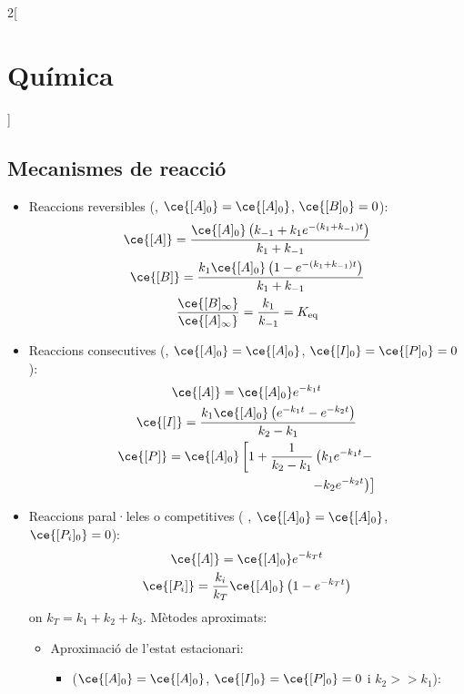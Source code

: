 \documentclass[../../../main.tex]{subfiles}
\begin{document}
\begin{multicols}{2}[\section{Química}]
\subsection{Mecanismes de reacció}
\begin{itemize}
    \item Reaccions reversibles (, $\ce{[A]_0}=\ce{[A]_0}$, $\ce{[B]_0}=0$):
    \begin{gather*}
        \ce{[A]}=\frac{\ce{[A]_0}\left(k_{-1}+k_1e^{-(k_1+k_{-1})t}\right)}{k_1+k_{-1}}\\
        \ce{[B]}=\frac{k_1\ce{[A]_0}\left(1-e^{-(k_1+k_{-1})t}\right)}{k_1+k_{-1}}\\
        \frac{\ce{[B]_\infty}}{\ce{[A]_\infty}}=\frac{k_1}{k_{-1}}=K_\text{eq}
    \end{gather*}
    \item Reaccions consecutives (, $\ce{[A]_0}=\ce{[A]_0}$, $\ce{[I]_0}=\ce{[P]_0}=0$):
    \begin{gather*}
        \ce{[A]}=\ce{[A]_0}e^{-k_1t}\\
        \ce{[I]}=\frac{k_1\ce{[A]_0}\left(e^{-k_1t}-e^{-k_2t}\right)}{k_2-k_1}\\
        \begin{split}
        \ce{[P]}=\ce{[A]_0}\left[1+\frac{1}{k_2-k_1}\left(k_1e^{-k_1t}-\right.\right.\\\left.\left.-k_2e^{-k_2t}\right)\right]
        \end{split}
    \end{gather*}
    \item Reaccions paral·leles o competitives (  , $\ce{[A]_0}=\ce{[A]_0}$, $\ce{[P_i]_0}=0$):
    \begin{gather*}
        \ce{[A]}=\ce{[A]_0}e^{-k_Tt}\\
        \ce{[P_i]}=\frac{k_i}{k_T}\ce{[A]_0}\left(1-e^{-k_Tt}\right)
    \end{gather*}
    {\footnotesize on $k_T=k_1+k_2+k_3$.}\newline
    Mètodes aproximats:
    \begin{itemize}
        \item Aproximació de l'estat es\-ta\-ci\-o\-na\-ri:
        \begin{itemize}
            \item {} ($\ce{[A]_0}=\ce{[A]_0}$, $\ce{[I]_0}=\ce{[P]_0}=0$ i $k_2>>k_1$):
            \begin{gather*}

\end{gather*}
\end{itemize}
\end{itemize}
\end{itemize}
\end{multicols}
\end{document}
